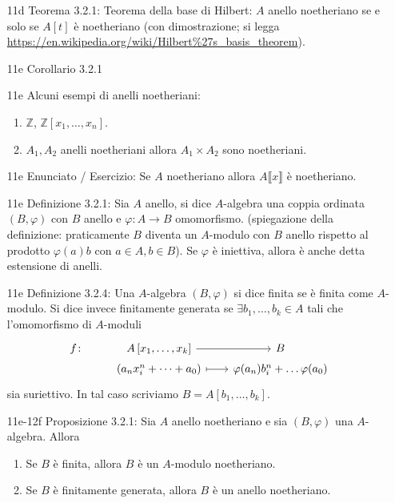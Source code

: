 \documentclass[italian]{article}
\begin{document}
	\begin{enumerate}
      \item[11d] Teorema 3.2.1: Teorema della base di Hilbert: $A$ anello
        noetheriano se e solo se $A\left[t\right]$ è noetheriano (con
        dimostrazione; si legga 
        \url{https://en.wikipedia.org/wiki/Hilbert\%27s_basis_theorem}). 
      \item[11e] Corollario 3.2.1 
      \item[11e] Alcuni esempi di anelli noetheriani: 
        \begin{enumerate}
          \item $\mathbb{Z}$, $\mathbb{Z}\left[x_1, \dots,x_n\right]$.
          \item $A_1, A_2$ anelli noetheriani allora $A_1 \times A_2$ sono
            noetheriani. 
        \end{enumerate}
      \item[11e] Enunciato / Esercizio: Se $A$ noetheriano allora $A\llbracket x \rrbracket$ 
        è noetheriano.
      \item[11e] Definizione 3.2.1: Sia $A$ anello, si dice $A$-algebra una
        coppia ordinata $(B,\varphi)$ con $B$ anello e $\varphi \colon A \to B$
        omomorfismo. (spiegazione della definizione: praticamente $B$ diventa un
        $A$-modulo con $B$ anello rispetto al prodotto $\varphi(a) b$ con $a \in
        A, b\in B$). Se $\varphi$ è iniettiva, allora è anche detta estensione di
        anelli.
      \item[11e] Definizione 3.2.4: Una $A$-algebra $(B, \varphi)$ si dice
        finita se è finita come $A$-modulo. Si dice invece finitamente generata
        se $\exists b_1, \dots, b_k \in A$ tali che l'omomorfismo di $A$-moduli
        \begin{equation*}
        	\begin{tikzcd}[row sep=0.1em, column sep = 2em]
        		f \colon   & A\left[ x_1, \dots,x_k \right] \arrow{r} & B \\
        	 			& (a_n x_i^n + \dots + a_0) \arrow[r, maps to] 
        	 			& \varphi(a_n)b^n_i + \dots \varphi(a_0)		
        	\end{tikzcd}
        \end{equation*}
        sia suriettivo. In tal caso scriviamo $B = A\left[ b_1, \dots, b_k
        \right]$.
      \item[11e-12f] Proposizione 3.2.1: Sia $A$ anello noetheriano e sia
        $(B,\varphi)$ una $A$-algebra. Allora
        \begin{enumerate}
          \item Se $B$ è finita, allora $B$ è un $A$-modulo noetheriano.
          \item Se $B$ è finitamente generata, allora $B$ è un anello
            noetheriano.
        \end{enumerate}
	\end{enumerate}
   
\end{document}
